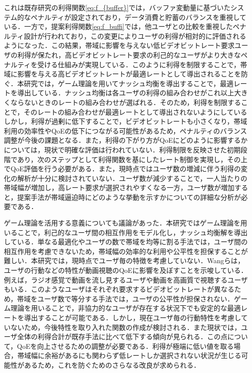 これは既存研究\cite{kison}\cite{motomoto}の利得関数\ref{eq:f_{buffer}}では，バッファ変動量に基づいたシステム的なペナルティが設定されており，データ消費と貯蓄のバランスを重視している．一方で，提案利得関数\ref{eq:f_buffi}では，他ユーザとの比較を重視したペナルティ設計が行われており，この変更によりユーザの利得が相対的に評価されるようになった．この結果，帯域に影響を与えない低ビデオビットレート要求ユーザの利得が保たれ，高ビデオビットレート要求の利己的なユーザがより大きなペナルティを受ける仕組みが実現している．このように利得を制限することで，帯域に影響を与える高ビデオビットレートが最適レートとして導出されることを防ぐ．本研究では，ゲーム理論を用いてナッシュ均衡を導出することで，最適レートを導出している．ナッシュ均衡は各ユーザの利得の組み合わせがこれ以上大きくならないときのレートの組み合わせが選ばれる．そのため，利得を制限することで，そのレートの組み合わせが最適レートとして導出されないようにしている
しかし，利得が過剰に低下することで，ビデオビットレートも小さくなり，帯域利用の効率性やQoEの低下につながる可能性があるため，ペナルティのバランス調整が今後の課題となる．また，利得の下がり方がQoEにどのように影響するかについては，現状で明確な評価は行われていない．利得制限を反映させた初期段階であり，次のステップとして利得関数を基にしたレート制御を実現し，その上でQoE評価を行う必要がある．また，現時点ではユーザ数の増減に伴う利得の変化の解析が十分に検討されていない．ユーザ数が減少することで，一人当たりの帯域幅が増加し，高レート要求が選択されやすくなる一方，ユーザ数が増加すると，提案手法が帯域逼迫時にどのような挙動を示すかについての詳細な分析が必要である．

ゲーム理論を活用する意義についても議論があった．本研究ではゲーム理論を用いることで，利己的なユーザ間の相互作用をモデル化し，ナッシュ均衡解を導出している．単なる最適化やユーザの数で帯域を均等に割る手法では，ユーザ間の相互作用を考慮できないため，帯域幅の効率的な利用や公平性を担保することが難しい．本研究では，現時点でユーザ毎の特徴を考慮していない．Wangら\cite{C.Wang}は，ユーザの行動などの特性が動画視聴のQoEに影響を及ぼすことを示唆している．例えば，ラジオ感覚で動画を流し見するユーザや動画を高画質で視聴するユーザもいる．このようなユーザはそれぞれ要求するビデオビットレートが異なるため，帯域をユーザ数で等分する手法では，ユーザの公平性が担保されない．ゲーム理論を用いることで，非協力的なユーザが存在する状況下でも安定的な最適レートを導出することが可能である．しかし，現在ユーザ毎の行動特性を考慮していないため，今後特性を取り入れた関数の作成が検討される．また現状では，ユーザ全体の利得合計が既存手法に比べて低下する傾向が見られる．この点について，QoEを向上させるための調整が必要である．利得が極端に低い値を取る場合，帯域幅に余裕があるにも関わらず低レートしか選択されない状況が生じる可能性があるため，これを防ぐためのさらなる改良が求められる．

